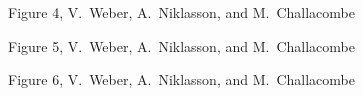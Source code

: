 \documentclass[prl,aps,preprint,showpacs,superbib]{revtex4}
\begin{document}
{\clearpage

\begin{center}
Figure 4, V.~Weber, A.~Niklasson,  and M.~Challacombe \\[1.cm]
\end{center}

\clearpage

\begin{center}
Figure 5, V.~Weber, A.~Niklasson,  and M.~Challacombe \\[1.cm]
\end{center}

\clearpage

\begin{center}
Figure 6, V.~Weber, A.~Niklasson,  and M.~Challacombe \\[1.cm]
\end{center}

}
\end{document}
